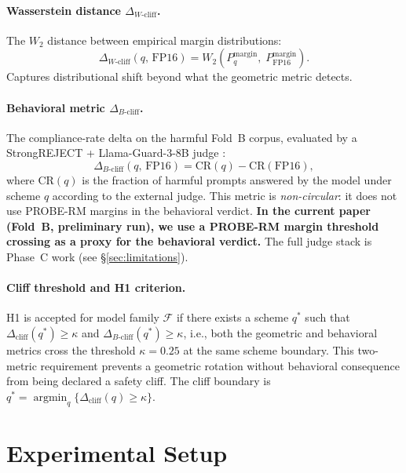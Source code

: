 \documentclass[11pt,a4paper]{article}
\newcommand{\cliff}{\Delta_{\mathrm{cliff}}}
\newcommand{\wcliff}{\Delta_{W\text{-cliff}}}
\newcommand{\bcliff}{\Delta_{B\text{-cliff}}}
\newcommand{\kap}{\kappa}
\begin{document}
\paragraph{Wasserstein distance $\wcliff$.}
The $W_2$ distance between empirical margin distributions:
\begin{equation}
  \wcliff(q,\,\mathrm{FP16}) = W_2\!\left(P_q^{\mathrm{margin}},\;
                               P_{\mathrm{FP16}}^{\mathrm{margin}}\right).
  \label{eq:wcliff}
\end{equation}
Captures distributional shift beyond what the geometric metric detects.

\paragraph{Behavioral metric $\bcliff$.}
The compliance-rate delta on the harmful Fold~B corpus, evaluated by a
StrongREJECT + Llama-Guard-3-8B judge \citep{souly2024strongreject,
inan2023llama_guard}:
\begin{equation}
  \bcliff(q,\,\mathrm{FP16}) = \mathrm{CR}(q) - \mathrm{CR}(\mathrm{FP16}),
  \label{eq:bcliff}
\end{equation}
where $\mathrm{CR}(q)$ is the fraction of harmful prompts answered by the
model under scheme $q$ according to the external judge.
This metric is \emph{non-circular}: it does not use PROBE-RM margins in the
behavioral verdict.
\textbf{In the current paper (Fold~B, preliminary run), we use a PROBE-RM
margin threshold crossing as a proxy for the behavioral verdict.}
The full judge stack is Phase~C work (see \S\ref{sec:limitations}).

\paragraph{Cliff threshold and H1 criterion.}
H1 is accepted for model family $\mathcal{F}$ if there exists a scheme $q^*$ such
that $\cliff(q^*) \ge \kap$ and $\bcliff(q^*) \ge \kap$, i.e., both the
geometric and behavioral metrics cross the threshold $\kap = 0.25$ at the same
scheme boundary.
This two-metric requirement prevents a geometric rotation without behavioral
consequence from being declared a safety cliff.
The cliff boundary is $q^* = \operatorname{argmin}_{q}\{\cliff(q) \ge \kap\}$.

\section{Experimental Setup}
\label{sec:setup}
\end{document}
